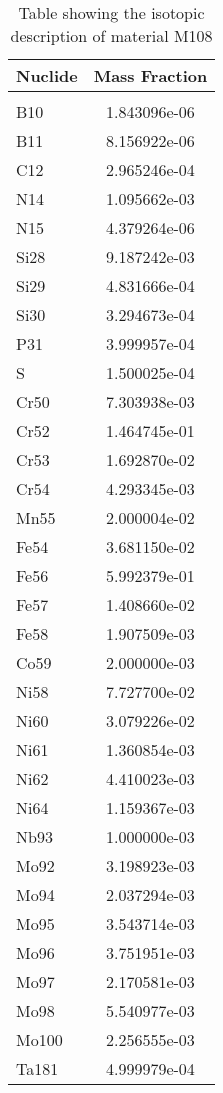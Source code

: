 \begin{centering}
\begin{table}[ht!]
\begin{tabular}{l | c}
\hline
Nuclide & Mass Fraction\\
\hline
\\
B10 & 1.843096e-06\\
B11 & 8.156922e-06\\
C12 & 2.965246e-04\\
N14 & 1.095662e-03\\
N15 & 4.379264e-06\\
Si28 & 9.187242e-03\\
Si29 & 4.831666e-04\\
Si30 & 3.294673e-04\\
P31 & 3.999957e-04\\
S & 1.500025e-04\\
Cr50 & 7.303938e-03\\
Cr52 & 1.464745e-01\\
Cr53 & 1.692870e-02\\
Cr54 & 4.293345e-03\\
Mn55 & 2.000004e-02\\
Fe54 & 3.681150e-02\\
Fe56 & 5.992379e-01\\
Fe57 & 1.408660e-02\\
Fe58 & 1.907509e-03\\
Co59 & 2.000000e-03\\
Ni58 & 7.727700e-02\\
Ni60 & 3.079226e-02\\
Ni61 & 1.360854e-03\\
Ni62 & 4.410023e-03\\
Ni64 & 1.159367e-03\\
Nb93 & 1.000000e-03\\
Mo92 & 3.198923e-03\\
Mo94 & 2.037294e-03\\
Mo95 & 3.543714e-03\\
Mo96 & 3.751951e-03\\
Mo97 & 2.170581e-03\\
Mo98 & 5.540977e-03\\
Mo100 & 2.256555e-03\\
Ta181 & 4.999979e-04
\end{tabular}
\caption{Table showing the isotopic description of material M108}
\label{table:material_M108}
\end{table}\clearpage


\end{centering}
